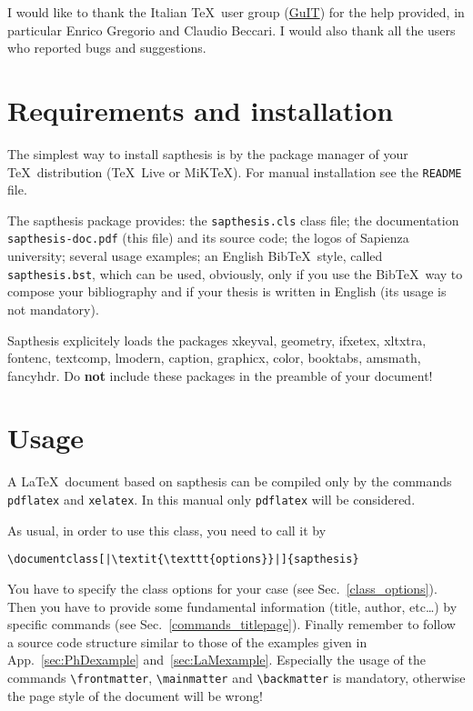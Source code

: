 \documentclass[a5paper,11pt]{article}
\newcommand{\bs}{\textbackslash}
\begin{document}
I would like to thank the Italian \TeX\ user group (\href{http://www.guitex.org/}{GuIT}) for the help provided, in particular Enrico Gregorio and Claudio Beccari. I would also thank all the users who reported bugs and suggestions.

\section[Requirements\\ and installation]{Requirements and installation}

The simplest way to install \textsf{sapthesis} is by the package manager of 
your \TeX\ distribution (\TeX\ Live or MiK\TeX). For manual installation see 
the \texttt{README} file. 

The \textsf{sapthesis} package provides: the 
\texttt{sapthesis.cls} class file; the documentation 
\texttt{sapthesis-doc.pdf} (this file) and its source code; the logos of 
Sapienza university; several usage examples; an English Bib\TeX\ style, called 
\texttt{sapthesis.bst}, which can be used, obviously, only if you use the 
Bib\TeX\ way to compose your bibliography and if your thesis is written in 
English (its usage is not mandatory).


\textsf{Sapthesis} explicitely loads the packages \textsf{xkeyval}, \textsf{geometry}, \textsf{ifxetex}, \textsf{xltxtra}, \textsf{fontenc}, \textsf{textcomp}, \textsf{lmodern}, \textsf{caption}, \textsf{graphicx}, \textsf{color}, \textsf{booktabs}, \textsf{amsmath}, \textsf{fancyhdr}.
Do \textbf{not} include these packages in the preamble of your document!





\section{Usage}

A \LaTeX\ document based on \textsf{sapthesis} can be compiled only by the commands
\texttt{pdflatex} and \texttt{xelatex}. In this manual only \texttt{pdflatex} will be considered.


As usual, in order to use this class, you need to call it by
\begin{lstlisting}
\documentclass[|\textit{\texttt{options}}|]{sapthesis}
\end{lstlisting}
You have to specify the class options for your case (see Sec.~\ref{class_options}). Then you have to provide some fundamental information (title, author, etc\ldots) by specific commands (see Sec.~\ref{commands_titlepage}). Finally remember to follow a source code structure similar to those of the examples given in App.~\ref{sec:PhDexample} and~\ref{sec:LaMexample}.
Especially the usage of the commands \texttt{\bs frontmatter}, \texttt{\bs mainmatter} and \texttt{\bs backmatter} is mandatory, otherwise the page style of the document will be wrong!
\end{document}

